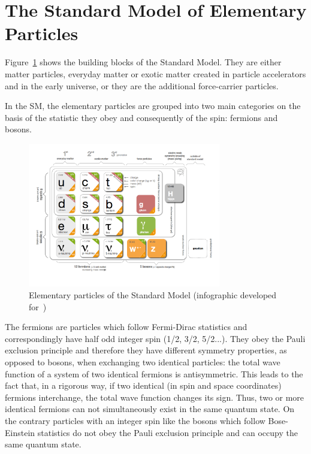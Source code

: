 \section{The Standard Model of Elementary Particles}\label{sec:sm}
Figure~\ref{fig:SMfig} shows the building blocks of the Standard Model. They are either matter particles, everyday matter
or exotic matter created in particle accelerators and in the early universe, or they are the additional force-carrier particles.

In the SM, the elementary particles are grouped into two main categories on the basis of the statistic they obey and consequently of the spin: fermions and bosons. 
\begin{figure}[h]
\centering
\includegraphics[clip,trim=1cm 2cm 2cm 1cm, width=0.75\textwidth]{Figures/c1/SMinfographic_image.png}
\caption{Elementary particles of the Standard Model (infographic
  developed for~\cite{particlefest})}
\label{fig:SMfig}
\end{figure}

The fermions are particles which follow Fermi-Dirac statistics and correspondingly have half odd integer spin (1/2, 3/2, 5/2...). They obey the Pauli exclusion principle and therefore they have different symmetry properties, as opposed to bosons, when exchanging two identical particles: the total wave function of a system of two identical fermions is antisymmetric. This leads to the fact that, in a rigorous way, if two identical (in spin and space coordinates) fermions interchange, the total wave function changes its sign. Thus, two or more identical fermions can not simultaneously exist in the same quantum state. On the contrary particles with an integer spin like the bosons which follow Bose-Einstein statistics do not obey the Pauli exclusion principle and can occupy the same quantum state. 


